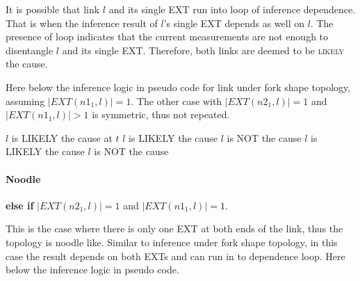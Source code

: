 It is possible that link $l$ and its single \ac{EXT} run into loop of inference dependence. That is when the inference result of $l$'s single \ac{EXT} depends as well on $l$. The presence of loop indicates that the current measurements are not enough to disentangle $l$ and its single \ac{EXT}. Therefore, both links are deemed to be \textsc{likely} the cause.

Here below the inference logic in pseudo code for link under fork shape topology, assuming $|EXT(n1_1,l)| = 1$. The other case with $|EXT(n2_1,l)| = 1$ and $|EXT(n1_1,l)| > 1$ is symmetric, thus not repeated.

\begin{algorithmic}
 
		\State $l$ is LIKELY the cause at $t$ 
	\Else {}
			\State $l$ is LIKELY the cause 
		\Else
				\State $l$ is NOT the cause 
			\Else
				\State $l$ is LIKELY the cause 
			\EndIf
		\EndIf
	\EndIf
\Else
	\State $l$ is NOT the cause
\EndIf
\end{algorithmic}

\paragraph{Noodle} \textbf{else if} $|EXT(n2_1,l)| = 1$ and $|EXT(n1_1,l)| = 1$.

This is the case where there is only one \ac{EXT} at both ends of the link, thus the topology is noodle like.
Similar to inference under fork shape topology, in this case the result depends on both \acp{EXT} and can run in to dependence loop. Here below the inference logic in pseudo code.

